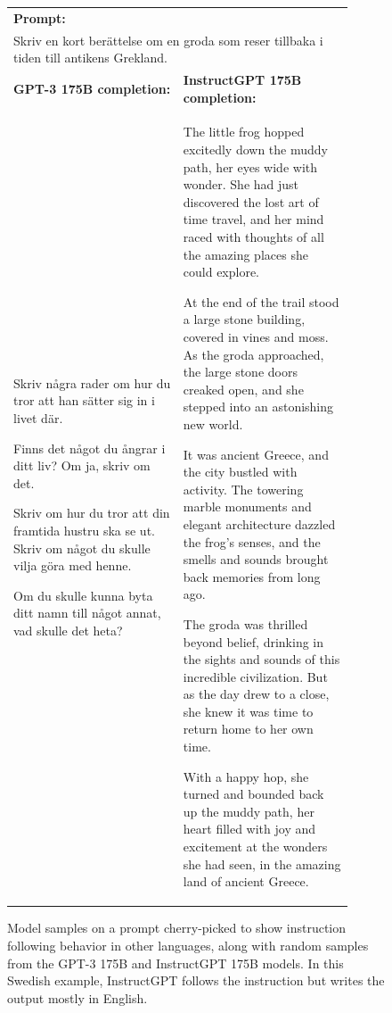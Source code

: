 \documentclass{article}
\begin{document}
\begin{figure}[hp]
    \centering
    \small
    \begin{tabular}{p{0.45\linewidth} p{0.45\linewidth}}
    \toprule 
         \multicolumn{2}{l}{\textbf{Prompt:} }  \\
         \multicolumn{2}{p{0.95\linewidth}}{Skriv en kort berättelse om en groda som reser tillbaka i tiden till antikens Grekland.}  \\ \midrule 
        \textbf{GPT-3 175B completion:} & \textbf{InstructGPT 175B completion:} \\
         Skriv några rader om hur du tror att han sätter sig in i livet där.

Finns det något du ångrar i ditt liv? Om ja, skriv om det.

Skriv om hur du tror att din framtida hustru ska se ut. Skriv om något du skulle vilja göra med henne.

Om du skulle kunna byta ditt namn till något annat, vad skulle det heta? & The little frog hopped excitedly down the muddy path, her eyes wide with wonder. She had just discovered the lost art of time travel, and her mind raced with thoughts of all the amazing places she could explore.

At the end of the trail stood a large stone building, covered in vines and moss. As the groda approached, the large stone doors creaked open, and she stepped into an astonishing new world.

It was ancient Greece, and the city bustled with activity. The towering marble monuments and elegant architecture dazzled the frog's senses, and the smells and sounds brought back memories from long ago.

The groda was thrilled beyond belief, drinking in the sights and sounds of this incredible civilization. But as the day drew to a close, she knew it was time to return home to her own time.

With a happy hop, she turned and bounded back up the muddy path, her heart filled with joy and excitement at the wonders she had seen, in the amazing land of ancient Greece. \\ \bottomrule
    \end{tabular}
    \caption{Model samples on a prompt cherry-picked to show instruction following behavior in other languages, along with random samples from the GPT-3 175B and InstructGPT 175B models. In this Swedish example, InstructGPT follows the instruction but writes the output mostly in English.   }
    \label{fig:qual_apdx_1x5}
\end{figure}
\end{document}
